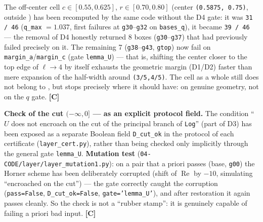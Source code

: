 The off-center cell $c \in [0.55, 0.625]$, $r \in [0.70, 0.80]$ (center
\texttt{(0.5875, 0.75)}, outside \Qcell) has been recomputed by the same code without the D4 gate:
it was \texttt{31 / 46} (\texttt{q\_max} $= 1.037$, first failures at \texttt{g30}--\texttt{g32} on \texttt{bases\_q}), it became
\texttt{39 / 46} --- the removal of D4 honestly returned 8 boxes (\texttt{g30}--\texttt{g37}) that had previously
failed precisely on it. The remaining 7 (\texttt{g38}--\texttt{g43}, \texttt{gtop}) now fail on
\texttt{margin\_a}/\texttt{margin\_c} (gate \texttt{lemma\_U}) --- that is, shifting the center closer to the
top edge of $\ell \to 4$ by itself exhausts the geometric margin (D1/D2)
faster than mere expansion of the half-width around \texttt{(3/5,4/5)}. The cell as a whole
still does not belong to \Ffamz, but stops precisely where it should have:
on genuine geometry, not on the $q$ gate. \textbf{[C]}

\textbf{Check of the cut $(-\infty,0]$ --- as an explicit protocol field.} The condition ``$U$ does not
encroach on the cut of the principal branch of \texttt{Log}'' (part of D3) has been exposed as
a separate Boolean field \texttt{D\_cut\_ok} in the protocol of each certificate (\texttt{layer\_\allowbreak cert.py}),
rather than being checked only implicitly through the general gate \texttt{lemma\_U}. \textbf{Mutation test}
(\texttt{04-\allowbreak CODE/\allowbreak layer/\allowbreak layer\_\allowbreak mutation1.py}):
on a pair that a priori passes (base, \texttt{g00}) the Horner scheme has been deliberately
corrupted (shift of $\operatorname{Re}$ by $-10$, simulating ``encroached on the cut'') --- the gate correctly
caught the corruption (\texttt{pass=False}, \texttt{D\_\allowbreak cut\_\allowbreak ok=False}, \texttt{gate='lemma\_\allowbreak U'}), and after
restoration it again passes cleanly. So the check is not a ``rubber stamp'':
it is genuinely capable of failing a priori bad input. \textbf{[C]}

